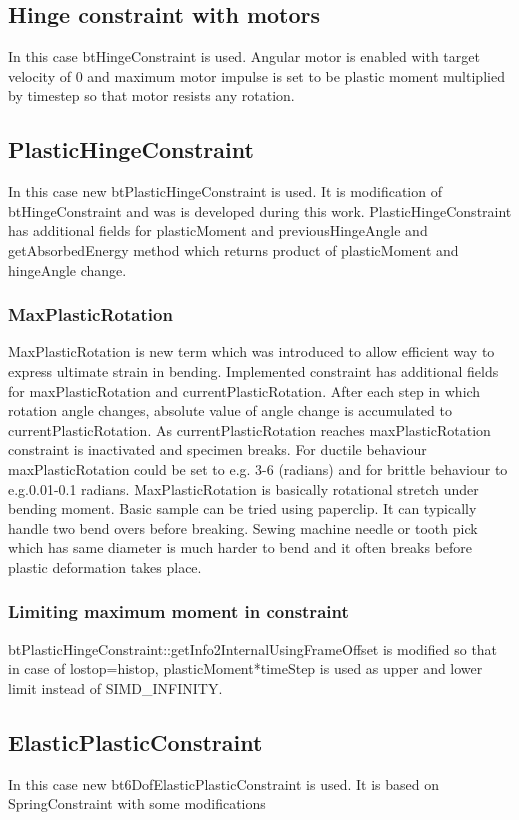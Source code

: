 \subsection{Hinge constraint with motors}
In this case btHingeConstraint is used.
Angular motor is enabled with target velocity of 0 and maximum motor impulse is set to
be plastic moment multiplied by timestep so that motor resists any rotation.

\subsection{PlasticHingeConstraint}
In this case new btPlasticHingeConstraint is used.
It is modification of btHingeConstraint and was is developed during this work.
PlasticHingeConstraint has additional fields for plasticMoment and previousHingeAngle and 
getAbsorbedEnergy method which returns product of plasticMoment and hingeAngle change.

\subsubsection{MaxPlasticRotation}
MaxPlasticRotation is new term which was introduced to allow efficient way to express ultimate strain in bending.
Implemented constraint has additional fields for maxPlasticRotation and currentPlasticRotation. 
After each step in which rotation angle changes, absolute value of 
angle change is accumulated to currentPlasticRotation. As currentPlasticRotation 
reaches maxPlasticRotation constraint is inactivated and specimen breaks. 
For ductile behaviour maxPlasticRotation could be set to e.g. 3-6 (radians) and for brittle
 behaviour to e.g.0.01-0.1 radians. MaxPlasticRotation is basically rotational stretch under bending moment.
 Basic sample can be tried using paperclip. It can typically handle two bend overs before breaking. 
Sewing machine needle or tooth pick which has same diameter is much harder to bend and it 
often breaks before plastic deformation takes place. 

\subsubsection{Limiting maximum moment in constraint}
btPlasticHingeConstraint::getInfo2InternalUsingFrameOffset is modified so that in case of lostop=histop, 
plasticMoment*timeStep is used as upper and lower limit instead of SIMD\_INFINITY. 

\subsection{ElasticPlasticConstraint}
In this case new bt6DofElasticPlasticConstraint is used.
It is based on SpringConstraint with some modifications

